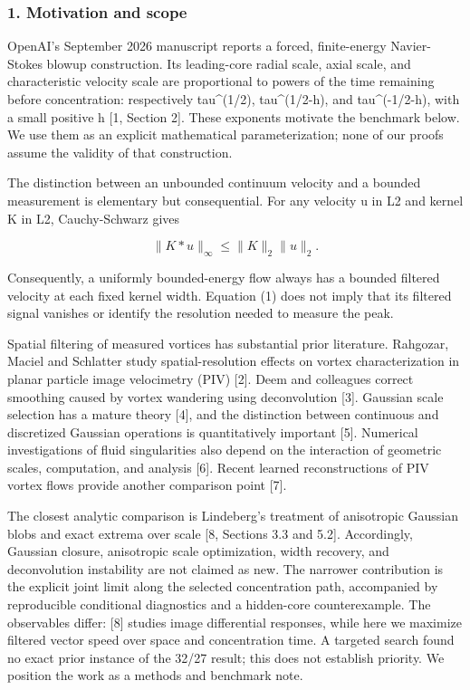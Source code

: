 \documentclass[
]{article}
\begin{document}
\hypertarget{motivation-and-scope}{%
\subsubsection{1. Motivation and scope}\label{motivation-and-scope}}

OpenAI's September 2026 manuscript reports a forced, finite-energy
Navier-Stokes blowup construction. Its leading-core radial scale, axial
scale, and characteristic velocity scale are proportional to powers of
the time remaining before concentration: respectively tau\^{}(1/2),
tau\^{}(1/2-h), and tau\^{}(-1/2-h), with a small positive h {[}1,
Section 2{]}. These exponents motivate the benchmark below. We use them
as an explicit mathematical parameterization; none of our proofs assume
the validity of that construction.

The distinction between an unbounded continuum velocity and a bounded
measurement is elementary but consequential. For any velocity u in L2
and kernel K in L2, Cauchy-Schwarz gives

\[
\|K*u\|_\infty\leq \|K\|_2\|u\|_2. \tag{1}
\]

Consequently, a uniformly bounded-energy flow always has a bounded
filtered velocity at each fixed kernel width. Equation (1) does not
imply that its filtered signal vanishes or identify the resolution
needed to measure the peak.

Spatial filtering of measured vortices has substantial prior literature.
Rahgozar, Maciel and Schlatter study spatial-resolution effects on
vortex characterization in planar particle image velocimetry (PIV)
{[}2{]}. Deem and colleagues correct smoothing caused by vortex
wandering using deconvolution {[}3{]}. Gaussian scale selection has a
mature theory {[}4{]}, and the distinction between continuous and
discretized Gaussian operations is quantitatively important {[}5{]}.
Numerical investigations of fluid singularities also depend on the
interaction of geometric scales, computation, and analysis {[}6{]}.
Recent learned reconstructions of PIV vortex flows provide another
comparison point {[}7{]}.

The closest analytic comparison is Lindeberg's treatment of anisotropic
Gaussian blobs and exact extrema over scale {[}8, Sections 3.3 and
5.2{]}. Accordingly, Gaussian closure, anisotropic scale optimization,
width recovery, and deconvolution instability are not claimed as new.
The narrower contribution is the explicit joint limit along the selected
concentration path, accompanied by reproducible conditional diagnostics
and a hidden-core counterexample. The observables differ: {[}8{]}
studies image differential responses, while here we maximize filtered
vector speed over space and concentration time. A targeted search found
no exact prior instance of the 32/27 result; this does not establish
priority. We position the work as a methods and benchmark note.
\end{document}
